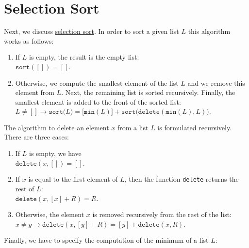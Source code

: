 \section{Selection Sort}
Next, we discuss 
\href{http://en.wikipedia.org/wiki/Selection_sort}{selection sort}.  In order to sort a given
list $L$ this algorithm works as
follows:
\begin{enumerate}
\item If $L$ is empty, the result is the empty list: \\[0.2cm]
      \hspace*{1.3cm} $\mathtt{sort}([]) = []$.
\item Otherwise, we compute the smallest element of the list $L$ and we remove this element from
      $L$.  Next, the remaining list is sorted recursively.  Finally, the smallest element is added
      to the front of the sorted list:
      \\[0.2cm]
      \hspace*{1.3cm} 
      $L \not= [] \rightarrow \mathtt{sort}\bigl(L\bigr) = \bigl[\texttt{min}(L)\bigr] +  \mathtt{sort}\bigl(\mathtt{delete}(\texttt{min}(L), L)\bigr)$.
\end{enumerate}
The algorithm to delete an element $x$ from a list $L$ is formulated recursively.  There are three cases:
\begin{enumerate}
\item If $L$ is empty, we have \\[0.2cm]
      \hspace*{1.3cm} $\mathtt{delete}(x, []) = []$.
\item If $x$ is equal to the first element of $L$, then the function \texttt{delete} returns the
      rest of $L$: \\[0.2cm]
      \hspace*{1.3cm} 
      $\mathtt{delete}(x, [x] + R) = R$.
\item Otherwise, the element $x$ is removed recursively from the rest of the list: \\[0.2cm]
      \hspace*{1.3cm}   
      $x \not = y \rightarrow \mathtt{delete}(x, [y] + R) = [y] + \mathtt{delete}(x,R)$.
\end{enumerate}
Finally, we have to specify the computation of the minimum of a list $L$:
